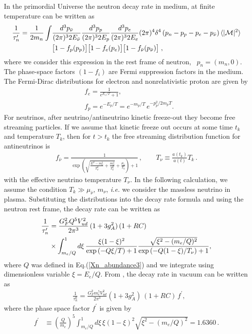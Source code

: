 In the primordial Universe the neutron decay rate in medium, at finite temperature can be written as~\cite{Kuznetsova:2010pi}
\begin{align}
\frac{1}{\tau^\prime_n}=\frac{1}{2m_n}\int&\frac{d^3p_{\bar{\nu}}}{(2\pi)^32E_{\bar{\nu}}}\frac{d^3p_p}{(2\pi)^32E_p}\frac{d^3p_e}{(2\pi)^32E_e}(2\pi)^4\delta^4\left(p_n-p_p-p_e-p_{\bar{\nu}}\right)\langle|\mathcal{M}|^2\rangle\notag\\
&\big[1-f_p(p_p)\big]\big[1-f_e(p_e)\big]\big[1-f_{\bar{\nu}}(p_{\bar{\nu}})\big]\;,
\end{align}
where we consider this expression in the rest frame of neutron, \ie\ $p_n=(m_n,0)$. The phase-space factors $(1-f_i)$ are Fermi suppression factors in the medium. The Fermi-Dirac distributions for electron and nonrelativistic proton are given by
\begin{align}
&f_e=\frac{1}{e^{E_e/T}+1},\\
&f_p=e^{-E_p/T}=e^{-m_p/T}\,e^{-p_p^2/2m_pT}.
\end{align}
For neutrinos, after neutrino/antineutrino kinetic freeze-out they become free streaming particles. If we assume that kinetic freeze out occurs at some time $t_k$ and temperature $T_k$, then for $t>t_k$ the free streaming distribution function  for antineutrinos is
\begin{align}
f_{\bar{\nu}}=\frac{1}{\exp{\left(\sqrt{\frac{E^2-m_\nu^2}{T_\nu^2}+\frac{m^2_\nu}{T^2_k}}+\frac{\mu_{\bar{\nu}}}{T_k}\right)+1}}\,,\qquad
T_\nu\equiv\frac{a(t_k)}{a(t)}T_k\,.
\end{align}
with the effective neutrino temperature $T_\nu$. In the following calculation, we assume the condition $T_k\gg\mu_{\bar{\nu}},\,m_\nu$, {\it i.e.\/} we consider the massless neutrino in plasma. Substituting the distributions into the decay rate formula and using the neutron rest frame, the decay rate can be written as 
\begin{align}
\label{Decay_rate_01}
\frac{1}{\tau_n^\prime}&=\frac{G^2_FQ^5V^2_{ud}}{2\pi^3}\,(1+3g^2_A)\,(1+RC)\\
&\times\int^1_{m_e/Q}d\xi\,\frac{\xi(1-\xi)^2}{\exp\left(-Q\xi/{T}\right)+1}\frac{\sqrt{\xi^2-(m_e/Q)^2}}{\exp\left(-Q(1-\xi)/T_\nu\right)+1},\notag
\end{align} 
where $Q$ was defined in Eq.\;(\ref{Xn_abundance3}) and we integrate using dimensionless variable $\xi=E_e/Q$. From , the decay rate in vacuum can be written as
\begin{align}
&\frac{1}{\tau_n^0}=\frac{G^2_Fm_e^5V^2_{ud}}{2\pi^3}(1+3g^2_A)\,(1+RC)\,f^\prime,
\end{align}
where the phase space factor $f^\prime$ is given by
\begin{align}
f^\prime&\equiv\left(\frac{Q}{m_e}\right)^5\int^1_{m_e/Q}d\xi\,{\xi(1-\xi)^2}\sqrt{\xi^2-(m_e/Q)^2}=1.6360\,.
\end{align}

